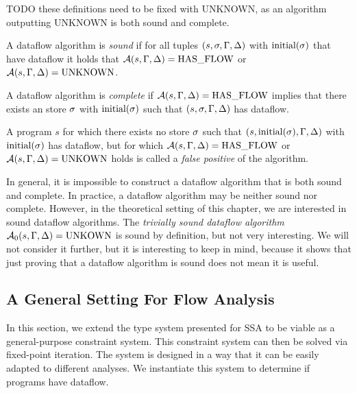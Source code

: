 TODO these definitions need to be fixed with UNKNOWN, as an algorithm outputting UNKNOWN is both sound and complete.
\begin{definition}[Soundness]
    A dataflow algorithm is \emph{sound} if for all tuples $(s, \sigma, \Gamma, \Delta)$ with $\text{initial}({\sigma})$ that
    have dataflow it holds that $\operatorname{\mathcal{A}}(s, \Gamma, \Delta) = \text{HAS\_FLOW}$ or
    $\operatorname{\mathcal{A}}(s, \Gamma, \Delta) = \text{UNKNOWN}$.
\end{definition}

\begin{definition}[Completeness]
    A dataflow algorithm is \emph{complete} if $\operatorname{\mathcal{A}}(s, \Gamma, \Delta) = \text{HAS\_FLOW}$
    implies that there exists an store $\sigma$ with $\text{initial}({\sigma})$
     such that $(s, \sigma, \Gamma, \Delta)$ has dataflow.
\end{definition}
\begin{definition}
    A program $s$ for which there exists no store $\sigma$ such that 
    $(s, \text{initial}({\sigma}), \Gamma, \Delta)$ with $\text{initial}({\sigma}){}$ has dataflow,
     but for which $\operatorname{\mathcal{A}}(s, \Gamma, \Delta) = \text{HAS\_FLOW}$
    or $\operatorname{\mathcal{A}}(s, \Gamma, \Delta) = \text{UNKOWN}$ holds
    is called a \emph{false positive} of the algorithm.
\end{definition}
\begin{remark}
    In general, it is impossible to construct a dataflow algorithm that is both 
    sound and complete.
    In practice, a dataflow algorithm may be neither sound nor complete.
    However, in the theoretical setting of this chapter, we are interested in 
    sound dataflow algorithms.
    The \emph{trivially sound dataflow algorithm} $\operatorname{\mathcal{A}}_0(s, \Gamma, \Delta) = \text{UNKOWN}$ 
    is sound by definition, but not very interesting.
    We will not consider it further, but it is interesting to keep in mind,
    because it shows that just proving that a dataflow algorithm is sound does not
    mean it is useful.    
\end{remark}

\subsection{A General Setting For Flow Analysis}
\label{sec:df-theory}
In this section, we extend the type system presented for SSA to be viable as a
general-purpose constraint system.
This constraint system can then be solved via fixed-point iteration.
The system is designed in a way that it can be easily adapted to different analyses.
We instantiate this system to determine if programs have dataflow.


